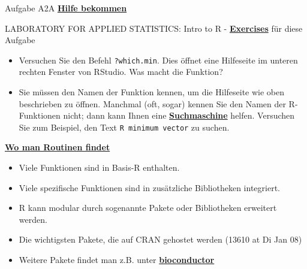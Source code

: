 \documentclass[ignorenonframetext,]{beamer}
\providecommand{\tightlist}{%
  \setlength{\itemsep}{0pt}\setlength{\parskip}{0pt}}
\begin{document}
\begin{frame}[fragile]{Aufgabe A2A
\href{http://web.math.ku.dk/~helle/R-intro/exercises.pdf}{\textbf{Hilfe
bekommen}}}

\begin{block}{LABORATORY FOR APPLIED STATISTICS: Intro to R -
\href{http://web.math.ku.dk/~helle/R-intro/exercises.pdf}{\textbf{Exercises}}
für diese Aufgabe}

\begin{itemize}
\item
  Versuchen Sie den Befehl \texttt{?which.min}. Dies öffnet eine
  Hilfeseite im unteren rechten Fenster von RStudio. Was macht die
  Funktion?
\item
  Sie müssen den Namen der Funktion kennen, um die Hilfeseite wie oben
  beschrieben zu öffnen. Manchmal (oft, sogar) kennen Sie den Namen der
  R-Funktionen nicht; dann kann Ihnen eine
  \href{https://duckduckgo.com/}{\textbf{Suchmaschine}} helfen.
  Versuchen Sie zum Beispiel, den Text \texttt{R\ minimum\ vector} zu
  suchen.
\end{itemize}

\end{block}

\end{frame}

\begin{frame}{\href{https://stats.idre.ucla.edu/r/seminars/intro/}{\textbf{Wo
man Routinen findet}}}

\begin{itemize}
\tightlist
\item
  Viele Funktionen sind in Basis-R enthalten.
\item
  Viele spezifische Funktionen sind in zusätzliche Bibliotheken
  integriert.
\item
  R kann modular durch sogenannte Pakete oder Bibliotheken erweitert
  werden.
\item
  Die wichtigsten Pakete, die auf CRAN gehostet werden (13610 at Di Jan
  08)
\item
  Weitere Pakete findet man z.B. unter
  \href{www.bioconductor.org}{\textbf{bioconductor}}
\end{itemize}

\end{frame}
\end{document}
